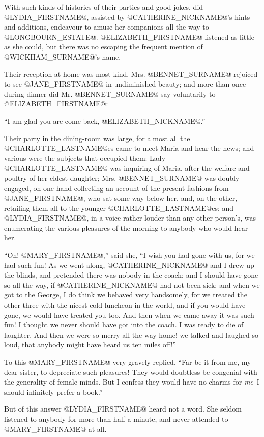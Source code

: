 With such kinds of histories of their parties and good jokes, did
@LYDIA_FIRSTNAME@, assisted by @CATHERINE_NICKNAME@'s hints and additions, endeavour to amuse her
companions all the way to @LONGBOURN_ESTATE@. @ELIZABETH_FIRSTNAME@ listened as little as she
could, but there was no escaping the frequent mention of @WICKHAM_SURNAME@'s name.

Their reception at home was most kind. Mrs. @BENNET_SURNAME@ rejoiced to see @JANE_FIRSTNAME@
in undiminished beauty; and more than once during dinner did Mr. @BENNET_SURNAME@
say voluntarily to @ELIZABETH_FIRSTNAME@:

``I am glad you are come back, @ELIZABETH_NICKNAME@.''

Their party in the dining-room was large, for almost all the @CHARLOTTE_LASTNAME@es
came to meet Maria and hear the news; and various were the subjects that
occupied them: Lady @CHARLOTTE_LASTNAME@ was inquiring of Maria, after the welfare and
poultry of her eldest daughter; Mrs. @BENNET_SURNAME@ was doubly engaged, on one
hand collecting an account of the present fashions from @JANE_FIRSTNAME@, who sat
some way below her, and, on the other, retailing them all to the younger
@CHARLOTTE_LASTNAME@es; and @LYDIA_FIRSTNAME@, in a voice rather louder than any other person's,
was enumerating the various pleasures of the morning to anybody who
would hear her.

``Oh! @MARY_FIRSTNAME@,'' said she, ``I wish you had gone with us, for we had such fun!
As we went along, @CATHERINE_NICKNAME@ and I drew up the blinds, and pretended there
was nobody in the coach; and I should have gone so all the way, if @CATHERINE_NICKNAME@
had not been sick; and when we got to the George, I do think we behaved
very handsomely, for we treated the other three with the nicest cold
luncheon in the world, and if you would have gone, we would have treated
you too. And then when we came away it was such fun! I thought we never
should have got into the coach. I was ready to die of laughter. And then
we were so merry all the way home! we talked and laughed so loud, that
anybody might have heard us ten miles off!''

To this @MARY_FIRSTNAME@ very gravely replied, ``Far be it from me, my dear sister,
to depreciate such pleasures! They would doubtless be congenial with the
generality of female minds. But I confess they would have no charms for
\textit{me}--I should infinitely prefer a book.''

But of this answer @LYDIA_FIRSTNAME@ heard not a word. She seldom listened to
anybody for more than half a minute, and never attended to @MARY_FIRSTNAME@ at all.

